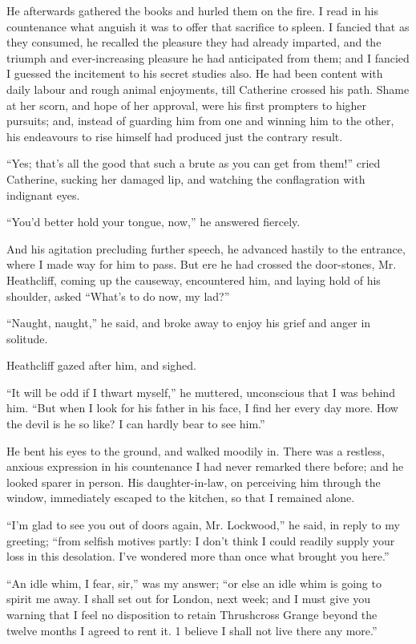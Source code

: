 \par He afterwards gathered the books and hurled them on the fire. I read in his countenance what anguish it was to offer that sacrifice to spleen. I fancied that as they consumed, he recalled the pleasure they had already imparted, and the triumph and ever-increasing pleasure he had anticipated from them; and I fancied I guessed the incitement to his secret studies also. He had been content with daily labour and rough animal enjoyments, till Catherine crossed his path. Shame at her scorn, and hope of her approval, were his first prompters to higher pursuits; and, instead of guarding him from one and winning him to the other, his endeavours to rise himself had produced just the contrary result.
\par “Yes; that's all the good that such a brute as you can get from them!” cried Catherine, sucking her damaged lip, and watching the conflagration with indignant eyes.
\par “You'd better hold your tongue, now,” he answered fiercely.
\par And his agitation precluding further speech, he advanced hastily to the entrance, where I made way for him to pass. But ere he had crossed the door-stones, Mr. Heathcliff, coming up the causeway, encountered him, and laying hold of his shoulder, asked “What's to do now, my lad?”
\par “Naught, naught,” he said, and broke away to enjoy his grief and anger in solitude.
\par Heathcliff gazed after him, and sighed.
\par “It will be odd if I thwart myself,” he muttered, unconscious that I was behind him. “But when I look for his father in his face, I find her every day more. How the devil is he so like? I can hardly bear to see him.”
\par He bent his eyes to the ground, and walked moodily in. There was a restless, anxious expression in his countenance I had never remarked there before; and he looked sparer in person. His daughter-in-law, on perceiving him through the window, immediately escaped to the kitchen, so that I remained alone.
\par “I'm glad to see you out of doors again, Mr. Lockwood,” he said, in reply to my greeting; “from selfish motives partly: I don't think I could readily supply your loss in this desolation. I've wondered more than once what brought you here.”
\par “An idle whim, I fear, sir,” was my answer; “or else an idle whim is going to spirit me away. I shall set out for London, next week; and I must give you warning that I feel no disposition to retain Thrushcross Grange beyond the twelve months I agreed to rent it. 1 believe I shall not live there any more.”
